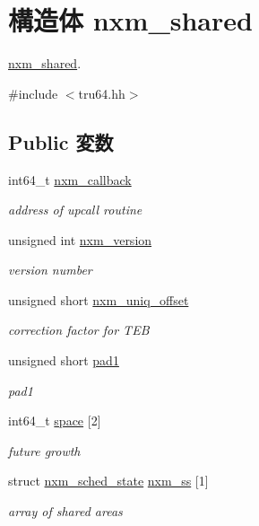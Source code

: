 \hypertarget{structTru64_1_1nxm__shared}{
\section{構造体 nxm\_\-shared}
\label{structTru64_1_1nxm__shared}
}


\hyperlink{structTru64_1_1nxm__shared}{nxm\_\-shared}.  


{\ttfamily \#include $<$tru64.hh$>$}\subsection*{Public 変数}
\begin{DoxyCompactItemize}
\item 
int64\_\-t \hyperlink{structTru64_1_1nxm__shared_a3e280a023ffa784d26a4f41306d718f0}{nxm\_\-callback}
\begin{DoxyCompactList}\small\item\em address of upcall routine \item\end{DoxyCompactList}\item 
unsigned int \hyperlink{structTru64_1_1nxm__shared_a70d8998193fec354ad484f497c870676}{nxm\_\-version}
\begin{DoxyCompactList}\small\item\em version number \item\end{DoxyCompactList}\item 
unsigned short \hyperlink{structTru64_1_1nxm__shared_a3b5f76b3e0f76058019240a3c5dcaec1}{nxm\_\-uniq\_\-offset}
\begin{DoxyCompactList}\small\item\em correction factor for TEB \item\end{DoxyCompactList}\item 
unsigned short \hyperlink{structTru64_1_1nxm__shared_ae142edeff5e8e134c7b06d379b189d61}{pad1}
\begin{DoxyCompactList}\small\item\em pad1 \item\end{DoxyCompactList}\item 
int64\_\-t \hyperlink{structTru64_1_1nxm__shared_a752b57f2668491e9bdc2d0f3c8ac0862}{space} \mbox{[}2\mbox{]}
\begin{DoxyCompactList}\small\item\em future growth \item\end{DoxyCompactList}\item 
struct \hyperlink{structTru64_1_1nxm__sched__state}{nxm\_\-sched\_\-state} \hyperlink{structTru64_1_1nxm__shared_a7bd02c4884a470c89958d25e45f3e34c}{nxm\_\-ss} \mbox{[}1\mbox{]}
\begin{DoxyCompactList}\small\item\em array of shared areas \item\end{DoxyCompactList}\end{DoxyCompactItemize}


